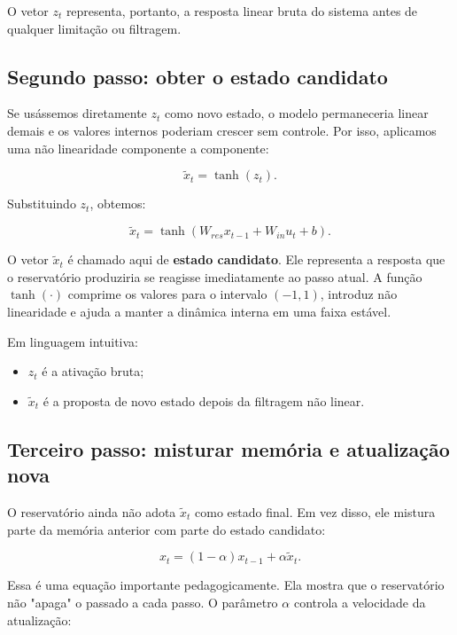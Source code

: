 \documentclass[12pt]{article}
\providecommand{\tightlist}{%
              \setlength{\itemsep}{0pt}\setlength{\parskip}{0pt}}
\begin{document}
O vetor \(z_t\) representa, portanto, a resposta linear bruta do sistema antes de qualquer limitação ou filtragem.

\subsection{Segundo passo: obter o estado candidato}\label{33-segundo-passo-obter-o-estado-candidato}

Se usássemos diretamente \(z_t\) como novo estado, o modelo permaneceria linear demais e os valores internos poderiam crescer sem controle. Por isso, aplicamos uma não linearidade componente a componente:

\[
\widetilde{x}_t = \tanh(z_t).
\]

Substituindo \(z_t\), obtemos:

\[
\widetilde{x}_t = \tanh(W_{res} x_{t-1} + W_{in} u_t + b).
\]

O vetor \(\widetilde{x}_t\) é chamado aqui de \textbf{estado candidato}. Ele representa a resposta que o reservatório produziria se reagisse imediatamente ao passo atual. A função \(\tanh(\cdot)\) comprime os valores para o intervalo \((-1,1)\), introduz não linearidade e ajuda a manter a dinâmica interna em uma faixa estável.

Em linguagem intuitiva:

\begin{itemize}
\tightlist
\item
  \(z_t\) é a ativação bruta;
\item
  \(\widetilde{x}_t\) é a proposta de novo estado depois da filtragem não linear.
\end{itemize}

\subsection{Terceiro passo: misturar memória e atualização nova}\label{34-terceiro-passo-misturar-memuxf3ria-e-atualizauxe7uxe3o-nova}

O reservatório ainda não adota \(\widetilde{x}_t\) como estado final. Em vez disso, ele mistura parte da memória anterior com parte do estado candidato:

\[
x_t = (1 - \alpha) x_{t-1} + \alpha \widetilde{x}_t.
\]

Essa é uma equação importante pedagogicamente. Ela mostra que o reservatório não "apaga" o passado a cada passo. O parâmetro \(\alpha\) controla a velocidade da atualização:
\end{document}
